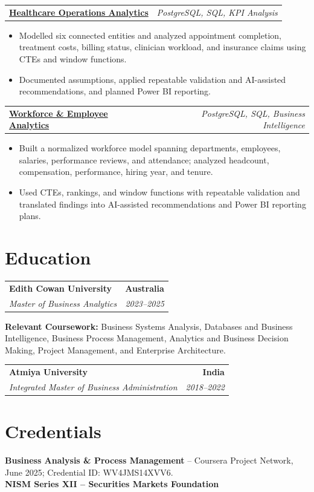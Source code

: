 \documentclass[letterpaper,10pt]{article}
\makeatletter
\newcommand{\role}[4]{%
  \begin{tabularx}{\textwidth}{@{}Xr@{}}
    \textbf{#1} & \textbf{#2} \\
    \textit{#3} & \textit{#4}
  \end{tabularx}\vspace{-1pt}
}
\newcommand{\project}[2]{%
  \begin{tabularx}{\textwidth}{@{}Xr@{}}
    \textbf{#1} & \textit{#2}
  \end{tabularx}\vspace{-1pt}
}
\makeatother
\begin{document}
\project{\href{https://github.com/jainalimehta/Healthcare-Analytics}{Healthcare Operations Analytics}}{PostgreSQL, SQL, KPI Analysis}
\begin{itemize}
  \item Modelled six connected entities and analyzed appointment completion, treatment costs, billing status, clinician workload, and insurance claims using CTEs and window functions.
  \item Documented assumptions, applied repeatable validation and AI-assisted recommendations, and planned Power BI reporting.
\end{itemize}
\vspace{1pt}

\project{\href{https://github.com/jainalimehta/HR-Analytics}{Workforce \& Employee Analytics}}{PostgreSQL, SQL, Business Intelligence}
\begin{itemize}
  \item Built a normalized workforce model spanning departments, employees, salaries, performance reviews, and attendance; analyzed headcount, compensation, performance, hiring year, and tenure.
  \item Used CTEs, rankings, and window functions with repeatable validation and translated findings into AI-assisted recommendations and Power BI reporting plans.
\end{itemize}

\section{Education}
\role{Edith Cowan University}{Australia}{Master of Business Analytics}{2023--2025}
\small\textbf{Relevant Coursework:} Business Systems Analysis, Databases and Business Intelligence, Business Process Management, Analytics and Business Decision Making, Project Management, and Enterprise Architecture.\\[2pt]
\role{Atmiya University}{India}{Integrated Master of Business Administration}{2018--2022}

\section{Credentials}
\small\textbf{Business Analysis \& Process Management} -- Coursera Project Network, June 2025; Credential ID: WV4JMS14XVV6.\\[-0.2pt]
\small\textbf{NISM Series XII -- Securities Markets Foundation}
\end{document}
